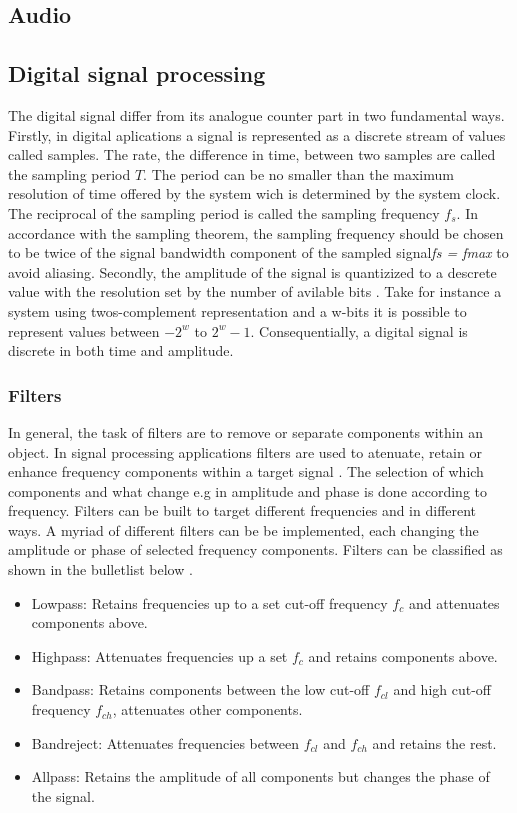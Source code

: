\documentclass[12p]{article}
\begin{document}
\subsection{Audio}
\label{Theory:Audio}

\subsection{Digital signal processing}
The digital signal differ from its analogue counter part in two fundamental ways. Firstly, in digital aplications a signal is represented as a discrete stream of values called samples. The rate, the difference in time, between two samples are called the sampling period $T$. The period can be no smaller than the maximum resolution of time offered by the system wich is determined by the system clock. The reciprocal of the sampling period is called the sampling frequency $f_s$. In accordance with the sampling theorem, the sampling frequency should be chosen to be twice of the signal bandwidth component of the sampled signal\emph{fs = fmax} to avoid aliasing. Secondly, the amplitude of the signal is quantizized to a descrete value with the resolution set by the number of avilable bits \cite{udo}. Take for instance a system using twos-complement representation and a w-bits it is possible to represent values between $-2^w$ to $2^w-1$. Consequentially, a digital signal is discrete in both time and amplitude.

\subsubsection{Filters}
In general, the task of filters are to remove or separate components within an object. In signal processing applications filters are used to atenuate, retain or enhance frequency components within a target signal \cite{udo}. The selection of which components and what change e.g in amplitude and phase is done according to frequency. Filters can be built to target different frequencies and in different ways. A myriad of different filters can be be implemented, each changing the amplitude or phase of selected frequency components. Filters can be classified as shown in the bulletlist below \cite{udo}.

\begin{itemize}
\item Lowpass: Retains frequencies up to a set cut-off frequency $f_c$ and attenuates components above.
\item Highpass: Attenuates frequencies up a set $f_c$ and retains components above.
\item Bandpass: Retains components between the low cut-off $f_{cl}$ and high cut-off frequency $f_{ch}$, attenuates other components.
\item Bandreject: Attenuates frequencies between $f_{cl}$ and $f_{ch}$ and retains the rest.
\item Allpass: Retains the amplitude of all components but changes the phase of the signal.
\end{itemize}
\end{document}
